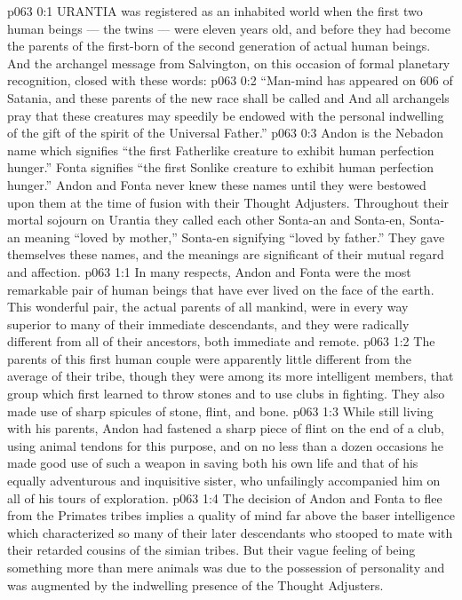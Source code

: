 \vs p063 0:1 URANTIA was registered as an inhabited world when the first two human beings --- the twins --- were eleven years old, and before they had become the parents of the first\hyp{}born of the second generation of actual human beings. And the archangel message from Salvington, on this occasion of formal planetary recognition, closed with these words:
\vs p063 0:2 “Man\hyp{}mind has appeared on 606 of Satania, and these parents of the new race shall be called  and  And all archangels pray that these creatures may speedily be endowed with the personal indwelling of the gift of the spirit of the Universal Father.”
\vs p063 0:3 \pc Andon is the Nebadon name which signifies “the first Fatherlike creature to exhibit human perfection hunger.” Fonta signifies “the first Sonlike creature to exhibit human perfection hunger.” Andon and Fonta never knew these names until they were bestowed upon them at the time of fusion with their Thought Adjusters. Throughout their mortal sojourn on Urantia they called each other Sonta\hyp{}an and Sonta\hyp{}en, Sonta\hyp{}an meaning “loved by mother,” Sonta\hyp{}en signifying “loved by father.” They gave themselves these names, and the meanings are significant of their mutual regard and affection.
\vs p063 1:1 In many respects, Andon and Fonta were the most remarkable pair of human beings that have ever lived on the face of the earth. This wonderful pair, the actual parents of all mankind, were in every way superior to many of their immediate descendants, and they were radically different from all of their ancestors, both immediate and remote.
\vs p063 1:2 The parents of this first human couple were apparently little different from the average of their tribe, though they were among its more intelligent members, that group which first learned to throw stones and to use clubs in fighting. They also made use of sharp spicules of stone, flint, and bone.
\vs p063 1:3 While still living with his parents, Andon had fastened a sharp piece of flint on the end of a club, using animal tendons for this purpose, and on no less than a dozen occasions he made good use of such a weapon in saving both his own life and that of his equally adventurous and inquisitive sister, who unfailingly accompanied him on all of his tours of exploration.
\vs p063 1:4 The decision of Andon and Fonta to flee from the Primates tribes implies a quality of mind far above the baser intelligence which characterized so many of their later descendants who stooped to mate with their retarded cousins of the simian tribes. But their vague feeling of being something more than mere animals was due to the possession of personality and was augmented by the indwelling presence of the Thought Adjusters.

